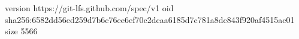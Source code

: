 version https://git-lfs.github.com/spec/v1
oid sha256:6582dd56ed259d7b6c76ee6ef70c2dcaa6185d7c781a8dc843f920af4515ac01
size 5566
